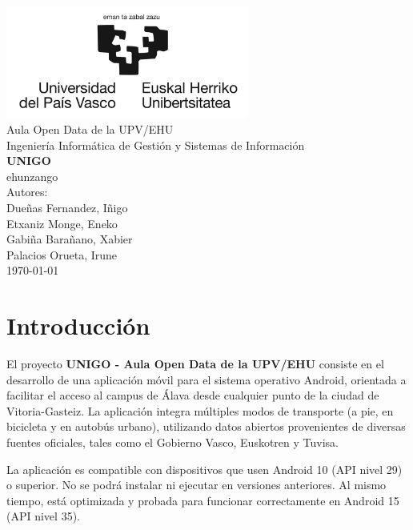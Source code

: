 \documentclass[a4paper,12pt]{report}
\begin{document}
  \begin{titlepage}
    \centering
    \includegraphics[width=0.6\textwidth]{../.img/ehuLogoLargo.jpg}\\
    \vspace{1cm}
    \LARGE Aula Open Data de la UPV/EHU\\
    \vspace{0.5cm}
    \Large Ingeniería Informática de Gestión y Sistemas de Información\\
    \vspace{3cm}
    \vspace{0.5cm}
    \Huge \textbf{UNIGO}\\
    \huge ehunzango\\
    \vspace{2.5cm}
    \Large Autores:\\
    \vspace{0.2cm}
    \large Dueñas Fernandez, Iñigo\\
    \large Etxaniz Monge, Eneko\\
    \large Gabiña Barañano, Xabier\\
    \large Palacios Orueta, Irune\\
    \vfill
    \today
  \end{titlepage}
  
\chapter{Introducción}
  El proyecto \textbf{UNIGO - Aula Open Data de la UPV/EHU} consiste en el desarrollo de una aplicación móvil para el sistema operativo Android, orientada a facilitar el acceso al campus de Álava desde cualquier punto de la ciudad de Vitoria-Gasteiz. La aplicación integra múltiples modos de transporte (a pie, en bicicleta y en autobús urbano), utilizando datos abiertos provenientes de diversas fuentes oficiales, tales como el Gobierno Vasco, Euskotren y Tuvisa.
  
  La aplicación es compatible con dispositivos que usen Android 10 (API nivel 29) o superior. No se podrá instalar ni ejecutar en versiones anteriores. Al mismo tiempo, está optimizada y probada para funcionar correctamente en Android 15 (API nivel 35).
  
\end{document}
